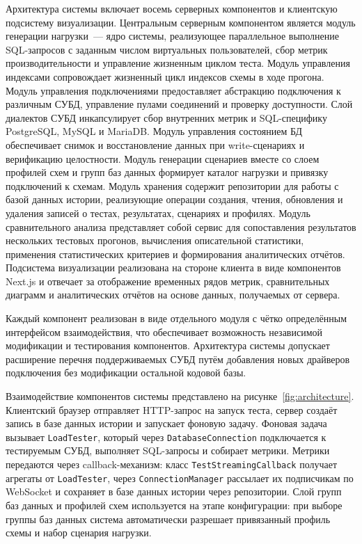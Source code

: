 Архитектура системы включает восемь серверных компонентов и клиентскую подсистему визуализации. Центральным серверным компонентом является модуль генерации нагрузки~--- ядро системы, реализующее параллельное выполнение SQL-запросов с заданным числом виртуальных пользователей, сбор метрик производительности и управление жизненным циклом теста. Модуль управления индексами сопровождает жизненный цикл индексов схемы в ходе прогона. Модуль управления подключениями предоставляет абстракцию подключения к различным СУБД, управление пулами соединений и проверку доступности. Слой диалектов СУБД инкапсулирует сбор внутренних метрик и SQL-специфику PostgreSQL, MySQL и MariaDB. Модуль управления состоянием БД обеспечивает снимок и восстановление данных при write-сценариях и верификацию целостности. Модуль генерации сценариев вместе со слоем профилей схем и групп баз данных формирует каталог нагрузки и привязку подключений к схемам. Модуль хранения содержит репозитории для работы с базой данных истории, реализующие операции создания, чтения, обновления и удаления записей о тестах, результатах, сценариях и профилях. Модуль сравнительного анализа представляет собой сервис для сопоставления результатов нескольких тестовых прогонов, вычисления описательной статистики, применения статистических критериев и формирования аналитических отчётов. Подсистема визуализации реализована на стороне клиента в виде компонентов Next.js и отвечает за отображение временных рядов метрик, сравнительных диаграмм и аналитических отчётов на основе данных, получаемых от сервера.

Каждый компонент реализован в виде отдельного модуля с чётко определённым интерфейсом взаимодействия, что обеспечивает возможность независимой модификации и тестирования компонентов. Архитектура системы допускает расширение перечня поддерживаемых СУБД путём добавления новых драйверов подключения без модификации остальной кодовой базы.

Взаимодействие компонентов системы представлено на рисунке~\ref{fig:architecture}. Клиентский браузер отправляет HTTP-запрос на запуск теста, сервер создаёт запись в базе данных истории и запускает фоновую задачу. Фоновая задача вызывает \texttt{LoadTester}, который через \texttt{DatabaseConnection} подключается к тестируемым СУБД, выполняет SQL-запросы и собирает метрики. Метрики передаются через callback-механизм: класс \texttt{TestStreamingCallback} получает агрегаты от \texttt{LoadTester}, через \texttt{ConnectionManager} рассылает их подписчикам по WebSocket и сохраняет в базе данных истории через репозитории. Слой групп баз данных и профилей схем используется на этапе конфигурации: при выборе группы баз данных система автоматически разрешает привязанный профиль схемы и набор сценария нагрузки.

